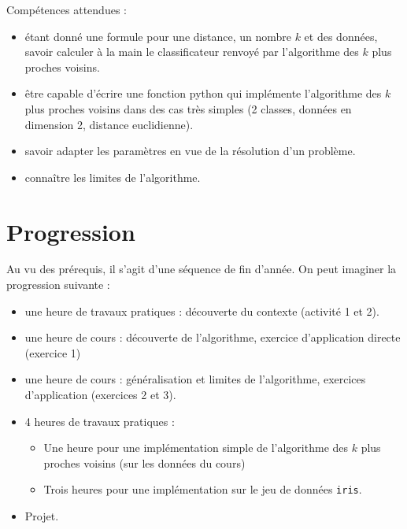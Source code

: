 \documentclass[12pt]{article}                   %
\theoremstyle{exercicestyle}
\theoremstyle{break2}
\theoremstyle{break3}
\begin{document}
Compétences attendues :
\begin{itemize}[label=\textbullet]
    \item étant donné une formule pour une distance, un nombre $k$ et des données, savoir calculer à la main le classificateur renvoyé par l'algorithme des $k$ plus proches voisins.
    \item être capable d'écrire une fonction python qui implémente l'algorithme des $k$ plus proches voisins dans des cas très simples (2 classes, données en dimension 2, distance euclidienne).
    \item savoir adapter les paramètres en vue de la résolution d'un problème.
    \item connaître les limites de l'algorithme.
\end{itemize}

\section{Progression}

Au vu des prérequis, il s'agit d'une séquence de fin d'année. On peut imaginer la progression suivante : 

\begin{itemize}[label=\textbullet]
    \item une heure de travaux pratiques : découverte du contexte (activité 1 et 2).
    \item une heure de cours : découverte de l'algorithme, exercice d'application directe (exercice 1)
    \item une heure de cours : généralisation et limites de l'algorithme, exercices d'application (exercices 2 et 3).
    \item 4 heures de travaux pratiques : 
        \begin{itemize}[label=\textbullet]
            \item Une heure pour une implémentation simple de l'algorithme des $k$ plus proches voisins (sur les données du cours)
            \item Trois heures pour une implémentation sur le jeu de données \texttt{iris}.
        \end{itemize}
    \item Projet.
\end{itemize}
\end{document}
